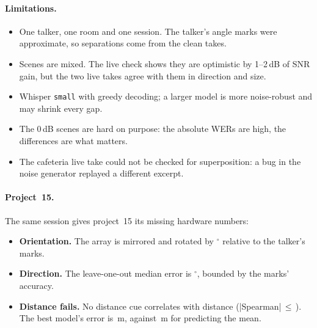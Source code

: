 \paragraph{Limitations.}
\begin{itemize}
\item One talker, one room and one session. The talker's angle marks were
  approximate, so separations come from the clean takes.
\item Scenes are mixed. The live check shows they are optimistic by 1--2\,dB
  of SNR gain, but the two live takes agree with them in direction and size.
\item Whisper \texttt{small} with greedy decoding; a larger model is more
  noise-robust and may shrink every gap.
\item The 0\,dB scenes are hard on purpose: the absolute WERs are high, the
  differences are what matters.
\item The cafeteria live take could not be checked for superposition: a
  bug in the noise generator replayed a different excerpt.
\end{itemize}

\paragraph{Project~15.} The same session gives project~15 its missing
hardware numbers:
\begin{itemize}
\item \textbf{Orientation.} The array is mirrored and rotated by
  \PFifteenOffset$^\circ$ relative to the talker's marks.
\item \textbf{Direction.} The leave-one-out median error is
  \PFifteenLooErr$^\circ$, bounded by the marks' accuracy.
\item \textbf{Distance fails.} No distance cue correlates with distance
  (|Spearman|\,$\leq$\,\PFifteenSpearmanMax). The best model's error is
  \PFifteenMaeBest\,m, against \PFifteenMaeMean\,m for predicting the mean.
\end{itemize}
